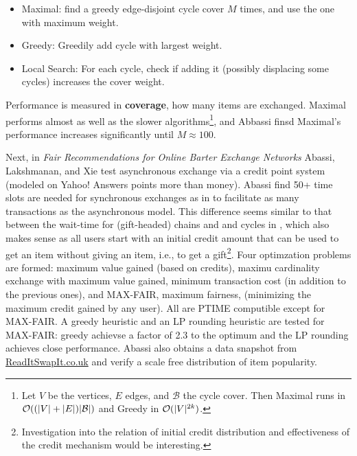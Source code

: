 \documentclass[main.tex]{subfiles}
\begin{document}
\begin{itemize}
  \item Maximal: find a greedy edge-disjoint cycle cover $M$ times, and use the one with maximum weight.
  \item Greedy: Greedily add cycle with largest weight.
  \item Local Search: For each cycle, check if adding it (possibly displacing some cycles) increases the cover weight.
\end{itemize}

Performance is measured in \textbf{coverage}, how many items are exchanged. Maximal performs almost as well as the slower algorithms\footnote{Let $V$ be the vertices, $E$ edges, and $\mathcal{B}$ the cycle cover. Then Maximal runs in $\mathcal{O}((|V| + |E|)|\mathcal{B}|)$ and Greedy  in $\mathcal{O}(|V|^{2k})$.}, and Abbassi finsd Maximal's performance increases significantly until $M \approx 100$.

Next, in \textit{Fair Recommendations for Online Barter Exchange Networks} Abassi, Lakshmanan, and Xie \cite{Abb2} test asynchronous exchange via a credit point system (modeled on Yahoo! Answers points more than money). Abassi find 50+ time slots are needed for synchronous exchanges as in \cite{Abb1} to facilitate as many transactions as the asynchronous model. This difference seems similar to that between the wait-time for (gift-headed) chains and and cycles in \cite{And1}, which also makes sense as all users start with an initial credit amount that can be used to get an item without giving an item, i.e., to get a gift\footnote{Investigation into the relation of initial credit distribution and effectiveness of the credit mechanism would be interesting.}. Four optimzation problems are formed: maximum value gained (based on credits), maximu cardinality exchange with maximum value gained, minimum transaction cost (in addition to the previous ones), and MAX-FAIR, maximum fairness, (minimizing the maximum credit gained by any user). All are PTIME computible except for MAX-FAIR. A greedy heuristic and an LP rounding heuristic are tested for MAX-FAIR: greedy achievse a factor of 2.3 to the optimum and the LP rounding achieves close performance. Abassi also obtains a data snapshot from \url{ReadItSwapIt.co.uk} and verify a scale free distribution of item popularity.
\end{document}
